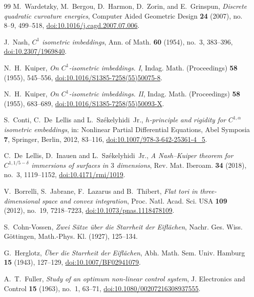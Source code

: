 \documentclass[11pt,reqno]{amsart}
\theoremstyle{definition}
\numberwithin{equation}{section}
\begin{document}
\begin{thebibliography}{99}
M.~Wardetzky, M.~Bergou, D.~Harmon, D.~Zorin, and E.~Grinspun,
\emph{Discrete quadratic curvature energies},
Computer Aided Geometric Design \textbf{24} (2007), no. 8--9, 499--518, \href{https://doi.org/10.1016/j.cagd.2007.07.006}{doi:10.1016/j.cagd.2007.07.006}.

J.~Nash,
\emph{$C^1$ isometric imbeddings},
Ann. of Math. \textbf{60} (1954), no.~3, 383--396, \href{https://doi.org/10.2307/1969840}{doi:10.2307/1969840}.

N.~H.~Kuiper,
\emph{On $C^1$-isometric imbeddings. I},
Indag. Math. (Proceedings) \textbf{58} (1955), 545--556, \href{https://doi.org/10.1016/S1385-7258(55)50075-8}{doi:10.1016/S1385-7258(55)50075-8}.

N.~H.~Kuiper,
\emph{On $C^1$-isometric imbeddings. II},
Indag. Math. (Proceedings) \textbf{58} (1955), 683--689, \href{https://doi.org/10.1016/S1385-7258(55)50093-X}{doi:10.1016/S1385-7258(55)50093-X}.

S.~Conti, C.~De~Lellis and L.~Sz\'ekelyhidi~Jr.,
\emph{$h$-principle and rigidity for $C^{1,\alpha}$ isometric embeddings},
in: Nonlinear Partial Differential Equations, Abel Symposia \textbf{7}, Springer, Berlin, 2012, 83--116, \href{https://doi.org/10.1007/978-3-642-25361-4_5}{doi:10.1007/978-3-642-25361-4\_5}.

C.~De~Lellis, D.~Inauen and L.~Sz\'ekelyhidi~Jr.,
\emph{A Nash--Kuiper theorem for $C^{1,1/5-\delta}$ immersions of surfaces in $3$ dimensions},
Rev. Mat. Iberoam. \textbf{34} (2018), no.~3, 1119--1152, \href{https://doi.org/10.4171/rmi/1019}{doi:10.4171/rmi/1019}.

V.~Borrelli, S.~Jabrane, F.~Lazarus and B.~Thibert,
\emph{Flat tori in three-dimensional space and convex integration},
Proc. Natl. Acad. Sci. USA \textbf{109} (2012), no.~19, 7218--7223, \href{https://doi.org/10.1073/pnas.1118478109}{doi:10.1073/pnas.1118478109}.

S.~Cohn-Vossen,
\emph{Zwei S\"atze \"uber die Starrheit der Eifl\"achen},
Nachr. Ges. Wiss. G\"ottingen, Math.-Phys. Kl. (1927), 125--134.

G.~Herglotz,
\emph{\"Uber die Starrheit der Eifl\"achen},
Abh. Math. Sem. Univ. Hamburg \textbf{15} (1943), 127--129, \href{https://doi.org/10.1007/BF02941079}{doi:10.1007/BF02941079}.

A.~T.~Fuller,
\emph{Study of an optimum non-linear control system},
J. Electronics and Control \textbf{15} (1963), no.~1, 63--71, \href{https://doi.org/10.1080/00207216308937555}{doi:10.1080/00207216308937555}.


\end{thebibliography}
\end{document}

